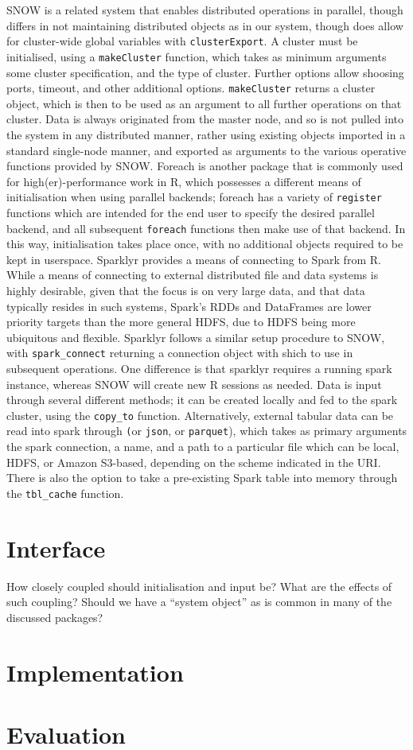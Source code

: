 \documentclass[a4paper,10pt]{article}
\begin{document}
SNOW is a related system that enables distributed operations in parallel,
though differs in not maintaining distributed objects as in our system, though
does allow for cluster-wide global variables with
\texttt{clusterExport}\cite{tierney18}.
A cluster must be initialised, using a \texttt{makeCluster} function,
which takes as minimum arguments some cluster specification, and the type of
cluster.
Further options allow shoosing ports, timeout, and other additional options.
\texttt{makeCluster} returns a cluster object, which is then to be used
as an argument to all further operations on that cluster.
Data is always originated from the master node, and so is not pulled into the
system in any distributed manner, rather using existing objects imported in a
standard single-node manner, and exported as arguments to the various operative
functions provided by SNOW.
Foreach is another package that is commonly used for high(er)-performance work
in R, which possesses a different means of initialisation when using parallel
backends; foreach has a variety of \texttt{register} functions which are
intended for the end user to specify the desired parallel backend, and all
subsequent \texttt{foreach} functions then make use of that
backend\cite{microsoft20}\cite{corporation19}.
In this way, initialisation takes place once, with no additional objects
required to be kept in userspace.
Sparklyr provides a means of connecting to Spark from R.
While a means of connecting to external distributed file and data systems is
highly desirable, given that the focus is on very large data, and that data
typically resides in such systems, Spark's RDDs and DataFrames are lower
priority targets than the more general HDFS, due to HDFS being more ubiquitous
and flexible.
Sparklyr follows a similar setup procedure to SNOW, with
\texttt{spark\_connect} returning a connection object with shich to use
in subsequent operations.
One difference is that sparklyr requires a running spark instance, whereas SNOW
will create new R sessions as needed.
Data is input through several different methods; it can be created locally and fed to the spark cluster, using the \texttt{copy\_to} function.
Alternatively, external tabular data can be read into spark through
\texttt (or \texttt{json}, or
\texttt{parquet}), which takes as primary arguments the spark
connection, a name, and a path to a particular file which can be local, HDFS,
or Amazon S3-based, depending on the scheme indicated in the URI.
There is also the option to take a pre-existing Spark table into memory through
the \texttt{tbl\_cache} function.

\section{Interface}
How closely coupled should initialisation and input be? What are the effects of such coupling?
Should we have a ``system object'' as is common in many of the discussed packages?

\section{Implementation}

\section{Evaluation}

\printbibliography
\end{document}
